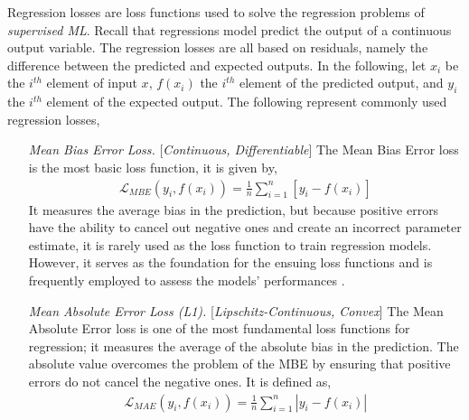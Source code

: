 \documentclass[nobib]{tufte-handout} %
\begin{document}
  Regression losses are loss functions used to solve the regression problems of \textit{supervised ML}. Recall that regressions model predict the output of a continuous output variable. The regression losses are all based on residuals, namely the difference between the predicted and expected outputs. In the following, let $x_i$ be the $i^{th}$ element of input $x$, $f(x_i)$ the $i^{th}$ element of the predicted output, and $y_i$ the $i^{th}$ element of the expected output. The following represent commonly used regression losses,
  \begin{enumerate}
    \item[\it Mean Bias Error Loss.][\textit{Continuous, Differentiable}] The Mean Bias Error loss is the most basic loss function, it is given by,
    \begin{equation}
      \begin{split}
        \mathcal{L}_{MBE} (y_i, f(x_i))= \frac{1}{n} \sum^{n}_{i=1} [y_i-f(x_i)]
      \end{split}
    \end{equation}
 It measures the average bias in the prediction, but because positive errors have the ability to cancel out negative ones and create an incorrect parameter estimate, it is rarely used as the loss function to train regression models. However, it serves as the foundation for the ensuing loss functions and is frequently employed to assess the models' performances \citep{ciampiconi2023survey}.
    \item[\it Mean Absolute Error Loss (L1).][\textit{Lipschitz-Continuous, Convex}] The Mean Absolute Error loss is one of the most fundamental loss functions for regression; it measures the average of the absolute bias in the prediction. The absolute value overcomes the problem of the MBE by ensuring that positive errors do not cancel the negative ones. It is defined as, 
\begin{equation}
      \begin{split}
        \mathcal{L}_{MAE}(y_i, f(x_i)) = \frac{1}{n} \sum^{n}_{i=1} |y_i-f(x_i)|
      \end{split}
    \end{equation}


\end{enumerate}
\end{document}
